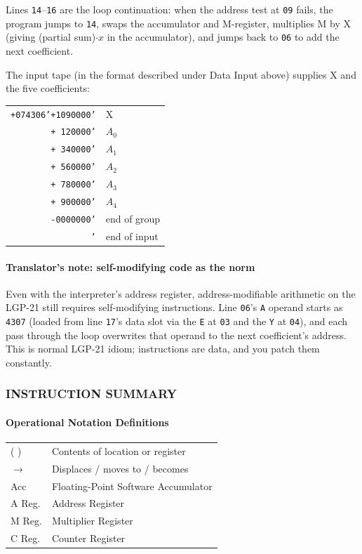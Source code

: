 \medskip
Lines \texttt{14}--\texttt{16} are the loop continuation: when the address test at \texttt{09} fails, the program jumps to \texttt{14}, swaps the accumulator and M-register, multiplies M by X (giving (partial sum)$\cdot x$ in the accumulator), and jumps back to \texttt{06} to add the next coefficient.

The input tape (in the format described under Data Input above) supplies X and the five coefficients:

\medskip
\noindent
\small
\ttfamily
\begin{tabular}{ll}
\texttt{+074306'+1090000'} & X \\
\texttt{\ \ \ \ \ \ \ \ + 120000'} & $A_0$ \\
\texttt{\ \ \ \ \ \ \ \ + 340000'} & $A_1$ \\
\texttt{\ \ \ \ \ \ \ \ + 560000'} & $A_2$ \\
\texttt{\ \ \ \ \ \ \ \ + 780000'} & $A_3$ \\
\texttt{\ \ \ \ \ \ \ \ + 900000'} & $A_4$ \\
\texttt{\ \ \ \ \ \ \ \ -0000000'} & end of group \\
\texttt{\ \ \ \ \ \ \ \ \ \ \ \ \ \ \ \ '} & end of input \\
\end{tabular}
\normalsize

\paragraph{Translator's note: self-modifying code as the norm}
Even with the interpreter's address register, address-modifiable arithmetic on the LGP-21 still requires self-modifying instructions. Line \texttt{06}'s \texttt{A} operand starts as \texttt{4307} (loaded from line \texttt{17}'s data slot via the \texttt{E} at \texttt{03} and the \texttt{Y} at \texttt{04}), and each pass through the loop overwrites that operand to the next coefficient's address. This is normal LGP-21 idiom; instructions are data, and you patch them constantly.

\subsubsection*{INSTRUCTION SUMMARY}

\paragraph{Operational Notation Definitions}
\begin{table}[h]
\small
\ttfamily
\begin{tabular}{ll}
( )  & Contents of location or register \\
$\rightarrow$  & Displaces / moves to / becomes \\
Acc & Floating-Point Software Accumulator \\
A Reg. & Address Register \\
M Reg. & Multiplier Register \\
C Reg. & Counter Register \\
\end{tabular}
\end{table}

